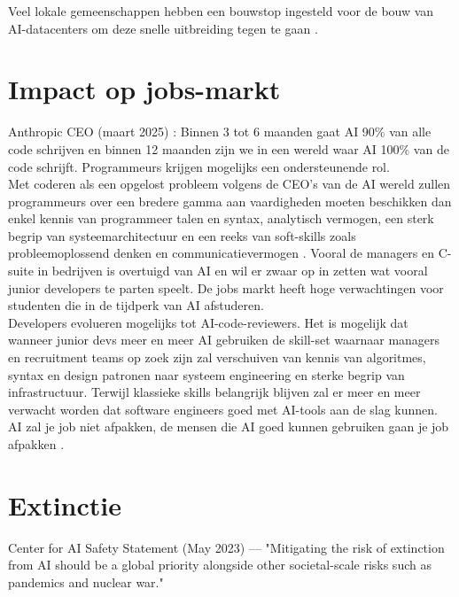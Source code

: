 Veel lokale gemeenschappen hebben een bouwstop ingesteld voor de bouw van AI-datacenters om deze snelle uitbreiding tegen te gaan \autocite{Bahar2026}.

\section{Impact op jobs-markt}
\label{sec:impactopjobsmarkt}
Anthropic CEO (maart 2025) \autocite{CFR2025}: Binnen 3 tot 6 maanden gaat AI 90\% van alle code schrijven en binnen 12 maanden zijn we in een wereld waar AI 100\% van de code schrijft. Programmeurs krijgen mogelijks een ondersteunende rol. \\

Met coderen als een opgelost probleem volgens de CEO's van de AI wereld zullen programmeurs over een bredere gamma aan vaardigheden moeten beschikken dan enkel kennis van programmeer talen en syntax, analytisch vermogen, een sterk begrip van systeemarchitectuur en een reeks van soft-skills zoals probleemoplossend denken en communicatievermogen \autocite{Rak2025}. Vooral de managers en C-suite in bedrijven is overtuigd van AI en wil er zwaar op in zetten wat vooral junior developers te parten speelt. De jobs markt heeft hoge verwachtingen voor studenten die in de tijdperk van AI afstuderen. \\

Developers evolueren mogelijks tot AI-code-reviewers. Het is mogelijk dat wanneer junior devs meer en meer AI gebruiken de skill-set waarnaar managers en recruitment teams op zoek zijn zal  verschuiven van kennis van algoritmes, syntax en design patronen naar systeem engineering en sterke begrip van infrastructuur. Terwijl klassieke skills belangrijk blijven zal er meer en meer verwacht worden dat software engineers goed met AI-tools aan de slag kunnen. AI zal je job niet afpakken, de mensen die AI goed kunnen gebruiken gaan je job afpakken \autocite{Rak2025}.


\section{Extinctie}
\label{sec:extinctie}
Center for AI Safety Statement (May 2023) — "Mitigating the risk of extinction from AI should be a global priority alongside other societal-scale risks such as pandemics and nuclear war." \\


